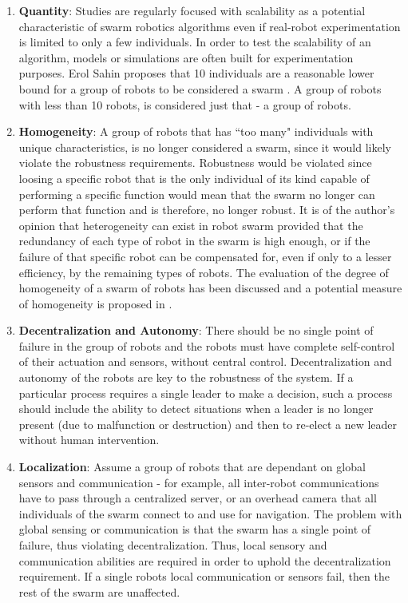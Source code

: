\begin{enumerate}

\item \textbf{Quantity}: Studies are regularly focused with scalability as a potential characteristic of swarm robotics algorithms even if real-robot experimentation is limited to only a few individuals. In order to test the scalability of an algorithm, models or simulations are often built for experimentation purposes. Erol Sahin proposes that 10 individuals are a reasonable lower bound for a group of robots to be considered a swarm \cite{csahin2005swarm}. A group of robots with less than 10 robots, is considered just that - a group of robots. 

\item \textbf{Homogeneity}: A group of robots that has ``too many" individuals with unique characteristics, is no longer considered a swarm, since it would likely violate the robustness requirements. Robustness would be violated since loosing a specific robot that is the only individual of its kind capable of performing a specific function would mean that the swarm no longer can perform that function and is therefore, no longer robust. It is of the author's opinion that heterogeneity can exist in robot swarm provided that the redundancy of each type of robot in the swarm is high enough, or if the failure of that specific robot can be compensated for, even if only to a lesser efficiency, by the remaining types of robots. The evaluation of the degree of homogeneity of a swarm of robots has been discussed and a potential measure of homogeneity is proposed in \cite{balch2000hierarchic}.

\item \textbf{Decentralization and Autonomy}: There should be no single point of failure in the group of robots and the robots must have complete self-control of their actuation and sensors, without central control. Decentralization and autonomy of the robots are key to the robustness of the system. If a particular process requires a single leader to make a decision, such a process should include the ability to detect situations when a leader is no longer present (due to malfunction or destruction) and then to re-elect a new leader without human intervention.

\item \textbf{Localization}: Assume a group of robots that are dependant on global sensors and communication - for example, all inter-robot communications have to pass through a centralized server, or an overhead camera that all individuals of the swarm connect to and use for navigation. The problem with global sensing or communication is that the swarm has a single point of failure, thus violating decentralization. Thus, local sensory and communication abilities are required in order to uphold the decentralization requirement. If a single robots local communication or sensors fail, then the rest of the swarm are unaffected.


\end{enumerate}
